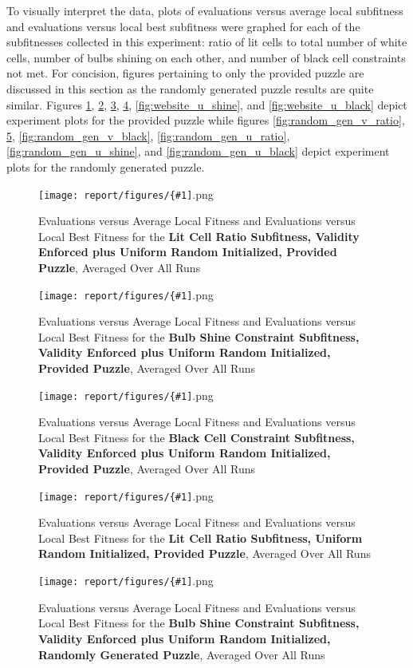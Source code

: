 \documentclass[11pt]{article}
\newcommand{\fitnessplotcaption}[1]{\caption{Evaluations versus Average Local Fitness and Evaluations versus 
    Local Best Fitness for the \textbf{{#1}}, Averaged Over All Runs}}
\newcommand{\addgraphic}[1]{\centerline{\texttt{[image: report/figures/\{\#1]}.png}}}
\begin{document}
To visually interpret the data, plots of evaluations versus average local subfitness and evaluations 
versus local best subfitness were graphed for each of the subfitnesses collected in this experiment:
ratio of lit cells to total number of white cells, number of bulbs shining on each other, and 
number of black cell constraints not met. For concision, figures pertaining to only the provided puzzle
are discussed in this section as the randomly generated puzzle results are quite similar. Figures 
\ref{fig:website_v_ratio}, \ref{fig:website_v_shine}, \ref{fig:website_v_black}, 
\ref{fig:website_u_ratio}, \ref{fig:website_u_shine}, and \ref{fig:website_u_black} depict experiment 
plots for the provided puzzle while figures
\ref{fig:random_gen_v_ratio}, \ref{fig:random_gen_v_shine}, \ref{fig:random_gen_v_black},
\ref{fig:random_gen_u_ratio}, \ref{fig:random_gen_u_shine}, and \ref{fig:random_gen_u_black} depict 
experiment plots for the randomly generated puzzle. 

\begin{figure}[H]
    \addgraphic{website_puzzle_lit_cell_ratio__graph}
    \fitnessplotcaption{Lit Cell Ratio Subfitness, Validity Enforced plus Uniform Random Initialized, Provided Puzzle}
    \label{fig:website_v_ratio}
\end{figure}

\begin{figure}[H]
    \addgraphic{website_puzzle_bulb_shine_constr__graph}
    \fitnessplotcaption{Bulb Shine Constraint Subfitness, Validity Enforced plus Uniform Random Initialized, Provided Puzzle}
    \label{fig:website_v_shine}
\end{figure}

\begin{figure}[H]
    \addgraphic{website_puzzle_black_cell_constr__graph}
    \fitnessplotcaption{Black Cell Constraint Subfitness, Validity Enforced plus Uniform Random Initialized, Provided Puzzle}
    \label{fig:website_v_black}
\end{figure}

\begin{figure}[H]
    \addgraphic{website_puzzle_uniform_random_init_lit_cell_ratio__graph}
    \fitnessplotcaption{Lit Cell Ratio Subfitness, Uniform Random Initialized, Provided Puzzle}
    \label{fig:website_u_ratio}
\end{figure}

\begin{figure}[H]
    \addgraphic{random_gen_bulb_shine_constr__graph}
    \fitnessplotcaption{Bulb Shine Constraint Subfitness, Validity Enforced plus Uniform Random Initialized, Randomly Generated Puzzle}
    \label{fig:random_gen_v_shine}
\end{figure}
\end{document}
